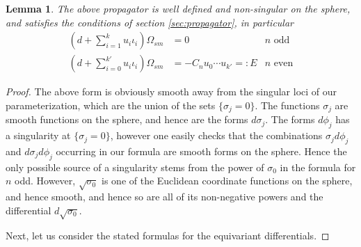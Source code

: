 \documentclass[a4paper]{amsart}
\theoremstyle{plain}
\newtheorem{lemma}[thm]{Lemma}
\theoremstyle{definition}
\begin{document}
\begin{lemma}
 The above propagator is well defined and non-singular on the sphere, and satisfies the conditions of section \ref{sec:propagator}, in particular
\begin{align}
\label{equ:equivdprop1}
  (d+\sum_{i=1}^k u_i\iota_i) \Omega_{sm} &= 0 & \text{$n$ odd} \\
  \label{equ:equivdprop2}
(d+\sum_{i=0}^{k'} u_i\iota_i) \Omega_{sm} &= -C_n u_0\cdots u_{k'} =: E 
& \text{$n$ even}
\end{align}
\end{lemma}
\begin{proof}
The above form is obviously smooth away from the singular loci of our parameterization, which are the union of the sets $\{\sigma_j=0\}$. The functions $\sigma_j$ are smooth functions on the sphere, and hence are the forms $d\sigma_j$.
The forms $d\phi_j$ has a singularity at $\{\sigma_j=0\}$, however one easily checks that the combinations $\sigma_jd\phi_j$ and $d\sigma_jd\phi_j$ occurring in our formula are smooth forms on the sphere.
Hence the only possible source of a singularity stems from the power of $\sigma_0$ in the formula for $n$ odd.
However, $\sqrt{\sigma_0}$ is one of the Euclidean coordinate functions on the sphere, and hence smooth, and hence so are all of its non-negative powers and the differential $d\sqrt{\sigma_0}$. 

Next, let us consider the stated formulas for the equivariant differentials.


\end{proof}
\end{document}
